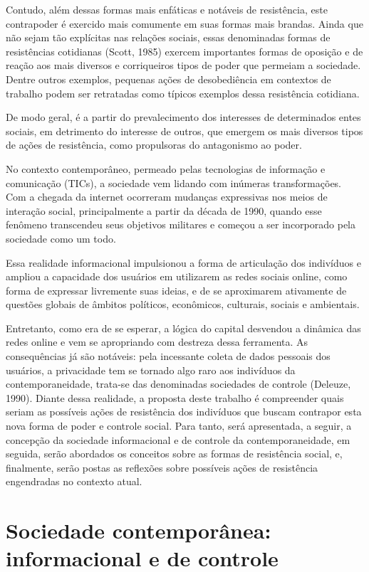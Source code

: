 Contudo, além dessas formas mais enfáticas e notáveis de resistência,
este contrapoder é exercido mais comumente em suas formas mais brandas.
Ainda que não sejam tão explícitas nas relações sociais, essas
denominadas formas de resistências cotidianas (Scott, 1985) exercem
importantes formas de oposição e de reação aos mais diversos e
corriqueiros tipos de poder que permeiam a sociedade. Dentre outros
exemplos, pequenas ações de desobediência em contextos de trabalho podem
ser retratadas como típicos exemplos dessa resistência cotidiana.

De modo geral, é a partir do prevalecimento dos interesses de
determinados entes sociais, em detrimento do interesse de outros, que
emergem os mais diversos tipos de ações de resistência, como propulsoras
do antagonismo ao poder.

No contexto contemporâneo, permeado pelas tecnologias de informação e
comunicação (TICs), a sociedade vem lidando com inúmeras transformações.
Com a chegada da internet ocorreram mudanças expressivas nos meios de
interação social, principalmente a partir da década de 1990, quando esse
fenômeno transcendeu seus objetivos militares e começou a ser
incorporado pela sociedade como um todo.

Essa realidade informacional impulsionou a forma de articulação dos
indivíduos e ampliou a capacidade dos usuários em utilizarem as redes
sociais online, como forma de expressar livremente suas ideias, e de se
aproximarem ativamente de questões globais de âmbitos políticos,
econômicos, culturais, sociais e ambientais.

Entretanto, como era de se esperar, a lógica do capital desvendou a
dinâmica das redes online e vem se apropriando com destreza dessa
ferramenta. As consequências já são notáveis: pela incessante coleta de
dados pessoais dos usuários, a privacidade tem se tornado algo raro aos
indivíduos da contemporaneidade, trata-se das denominadas sociedades de
controle (Deleuze, 1990). Diante dessa realidade, a proposta deste
trabalho é compreender quais seriam as possíveis ações de resistência
dos indivíduos que buscam contrapor esta nova forma de poder e controle
social. Para tanto, será apresentada, a seguir, a concepção da sociedade
informacional e de controle da contemporaneidade, em seguida, serão
abordados os conceitos sobre as formas de resistência social, e,
finalmente, serão postas as reflexões sobre possíveis ações de
resistência engendradas no contexto atual.

\section{Sociedade contemporânea: informacional e de controle}

